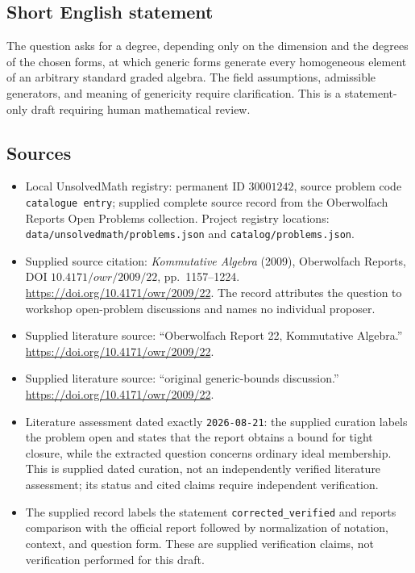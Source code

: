 \documentclass[11pt]{article}
\begin{document}
\subsection{Short English statement}
The question asks for a degree, depending only on the dimension and the degrees of the chosen forms, at which generic forms generate every homogeneous element of an arbitrary standard graded algebra. The field assumptions, admissible generators, and meaning of genericity require clarification. This is a statement-only draft requiring human mathematical review.
\subsection{Sources}
\begin{itemize}
\item Local UnsolvedMath registry: permanent ID \(30001242\), source problem code \texttt{catalogue entry}; supplied complete source record from the Oberwolfach Reports Open Problems collection. Project registry locations: \texttt{data/unsolvedmath/problems.json} and \texttt{catalog/problems.json}.
\item Supplied source citation: \emph{Kommutative Algebra} (2009), Oberwolfach Reports, DOI \(10.4171/owr/2009/22\), pp.\ 1157--1224. \url{https://doi.org/10.4171/owr/2009/22}. The record attributes the question to workshop open-problem discussions and names no individual proposer.
\item Supplied literature source: ``Oberwolfach Report 22, Kommutative Algebra.'' \url{https://doi.org/10.4171/owr/2009/22}.
\item Supplied literature source: ``original generic-bounds discussion.'' \url{https://doi.org/10.4171/owr/2009/22}.
\item Literature assessment dated exactly \texttt{2026-08-21}: the supplied curation labels the problem open and states that the report obtains a bound for tight closure, while the extracted question concerns ordinary ideal membership. This is supplied dated curation, not an independently verified literature assessment; its status and cited claims require independent verification.
\item The supplied record labels the statement \texttt{corrected\_verified} and reports comparison with the official report followed by normalization of notation, context, and question form. These are supplied verification claims, not verification performed for this draft.
\end{itemize}
\end{document}
